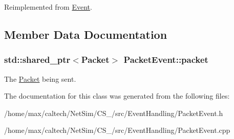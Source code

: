\-Reimplemented from \hyperlink{classEvent_a924194a887aa70888e08a04b69389bd6}{\-Event}.



\subsection{\-Member \-Data \-Documentation}
\hypertarget{classPacketEvent_ac3390dfb095c14e0b5c078b51dd914cf}{
\subsubsection[{packet}]{\setlength{\rightskip}{0pt plus 5cm}std\-::shared\-\_\-ptr$<${\bf \-Packet}$>$ {\bf \-Packet\-Event\-::packet}}}\label{classPacketEvent_ac3390dfb095c14e0b5c078b51dd914cf}


\-The \hyperlink{classPacket}{\-Packet} being sent. 



\-The documentation for this class was generated from the following files\-:\begin{DoxyCompactItemize}
\item 
/home/max/caltech/\-Net\-Sim/\-C\-S\-\_/src/\-Event\-Handling/\-Packet\-Event.\-h\item 
/home/max/caltech/\-Net\-Sim/\-C\-S\-\_/src/\-Event\-Handling/\-Packet\-Event.\-cpp\end{DoxyCompactItemize}
